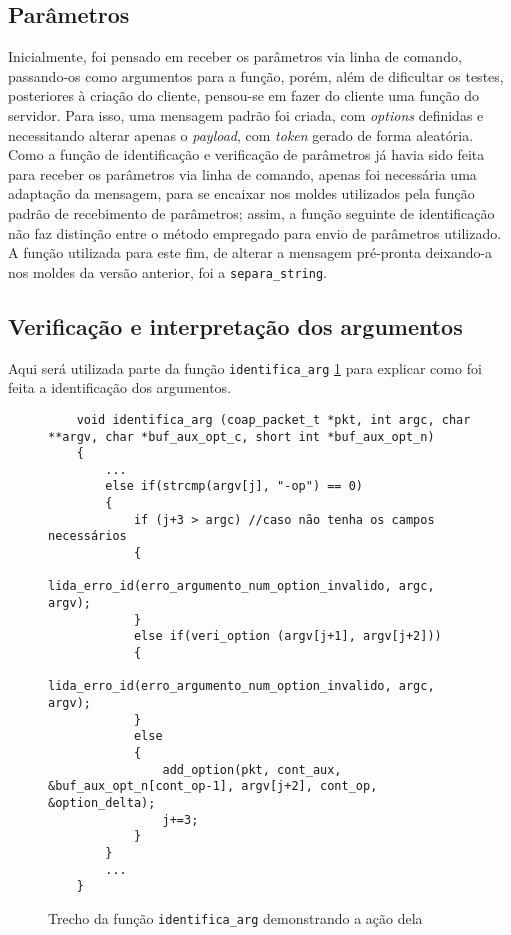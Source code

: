 \subsection{Parâmetros}
\label{subsection:parametros}

Inicialmente, foi pensado em receber os parâmetros via linha de comando, passando-os como argumentos para a função, porém, além de dificultar os testes, posteriores à criação do cliente, pensou-se em fazer do cliente uma função do servidor. Para isso, uma mensagem padrão foi criada, com \textit{options} definidas e necessitando alterar apenas o \textit{payload}, com \textit{token} gerado de forma aleatória.
Como a função de identificação e verificação de parâmetros já havia sido feita para receber os parâmetros via linha de comando, apenas foi necessária uma adaptação da mensagem, para se encaixar nos moldes utilizados pela função padrão de recebimento de parâmetros; assim, a função seguinte de identificação não faz distinção entre o método empregado para envio de parâmetros utilizado.
A função utilizada para este fim, de alterar a mensagem pré-pronta deixando-a nos moldes da versão anterior, foi a \texttt{separa\_string}.

\subsection{Verificação e interpretação dos argumentos}

Aqui será utilizada parte da função \texttt{identifica\_arg} \ref{code:identifica_arg} para explicar como foi feita a identificação dos argumentos.

\begin{figure}[!htb]
	\begin{lstlisting}
	void identifica_arg (coap_packet_t *pkt, int argc, char **argv, char *buf_aux_opt_c, short int *buf_aux_opt_n)
	{
		...
		else if(strcmp(argv[j], "-op") == 0)
		{
			if (j+3 > argc) //caso não tenha os campos necessários
			{
				lida_erro_id(erro_argumento_num_option_invalido, argc, argv);
			}
			else if(veri_option (argv[j+1], argv[j+2]))
			{
				lida_erro_id(erro_argumento_num_option_invalido, argc, argv);
			}
			else
			{
				add_option(pkt, cont_aux, &buf_aux_opt_n[cont_op-1], argv[j+2], cont_op, &option_delta);
				j+=3;
			}
		}
		...
	}
	\end{lstlisting}
	\caption{Trecho da função \texttt{identifica\_arg} demonstrando a ação dela}
	\label{code:identifica_arg}
\end{figure}
\hfill \break
\hfill \break
\hfill \break
\hfill \break
\hfill \break
\hfill \break
\hfill \break
\hfill \break
\hfill \break
\hfill \break
\hfill \break

